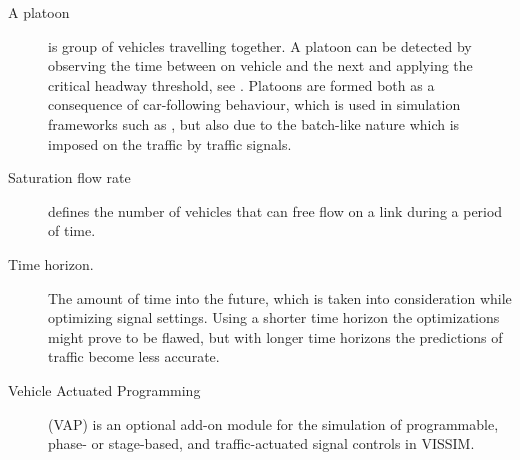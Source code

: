 \begin{description}
	\item[A platoon] is group of vehicles travelling together. A platoon can be detected by observing the time between on vehicle and the next and applying the critical headway threshold, see \cite[sct. 2]{25}. 
Platoons are formed both as a consequence of car-following behaviour, which is used in simulation frameworks such as \cite{treiber-2000-62}, but also due to the batch-like nature which is imposed on the traffic by traffic signals.

\item[Saturation flow rate] defines the number of vehicles that can free flow on a link during a period of time.

\item[Time horizon.] The amount of time into the future, which is taken into consideration while optimizing signal settings. Using a shorter time horizon the optimizations might prove to be flawed, but with longer time horizons the predictions of traffic become less accurate.

\item[Vehicle Actuated Programming] (VAP) is an optional add-on module for the
simulation of programmable, phase- or stage-based, and traffic-actuated signal controls in VISSIM.

\end{description}
